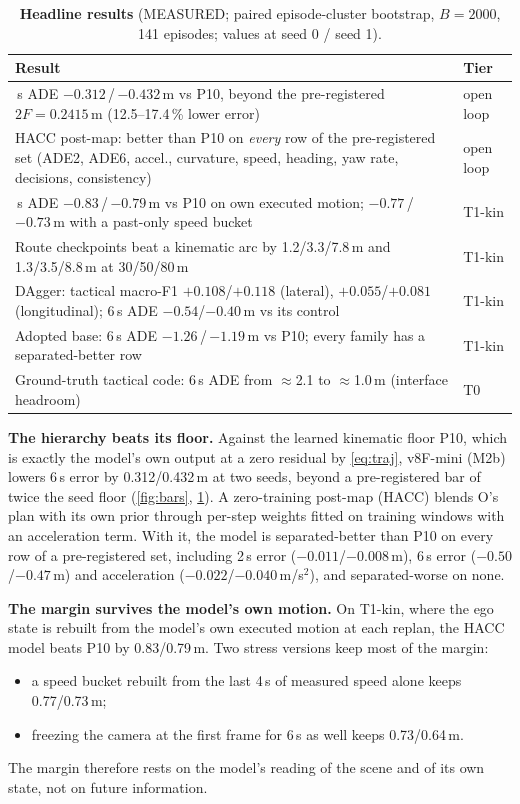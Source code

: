 \documentclass[10pt,twocolumn]{article}
\theoremstyle{remark}
\begin{document}
\begin{table}[t]
\centering
\caption{\textbf{Headline results} (MEASURED; paired episode-cluster bootstrap, $B=2000$, 141 episodes; values at seed 0 / seed 1).}
\label{tab:headline}
\small
\begin{tabularx}{\columnwidth}{@{}>{\raggedright\arraybackslash}Xl@{}}
\toprule
Result & Tier \\
\midrule
6\,s ADE $-0.312$\,/\,$-0.432$\,m vs P10, beyond the pre-registered $2F=0.2415$\,m (12.5--17.4\,\% lower error) & open loop \\
HACC post-map: better than P10 on \emph{every} row of the pre-registered set (ADE2, ADE6, accel., curvature, speed, heading, yaw rate, decisions, consistency) & open loop \\
6\,s ADE $-0.83$\,/\,$-0.79$\,m vs P10 on own executed motion; $-0.77$\,/\,$-0.73$\,m with a past-only speed bucket & T1-kin \\
Route checkpoints beat a kinematic arc by 1.2/3.3/7.8\,m and 1.3/3.5/8.8\,m at 30/50/80\,m & T1-kin \\
DAgger: tactical macro-F1 $+0.108$/$+0.118$ (lateral), $+0.055$/$+0.081$ (longitudinal); 6\,s ADE $-0.54$/$-0.40$\,m vs its control & T1-kin \\
Adopted base: 6\,s ADE $-1.26$\,/\,$-1.19$\,m vs P10; every family has a separated-better row & T1-kin \\
Ground-truth tactical code: 6\,s ADE from $\approx$2.1 to $\approx$1.0\,m (interface headroom) & T0 \\
\bottomrule
\end{tabularx}
\end{table}

\textbf{The hierarchy beats its floor.} Against the learned kinematic floor P10, which is exactly the model's own output at a zero
residual by \cref{eq:traj}, v8F-mini (M2b) lowers 6\,s error by 0.312/0.432\,m at two seeds, beyond a pre-registered bar of twice the
seed floor (\cref{fig:bars}, \cref{tab:headline}). A zero-training post-map (HACC) blends O's plan with its own prior through
per-step weights fitted on training windows with an acceleration term. With it, the model is separated-better than P10 on every row of
a pre-registered set, including 2\,s error ($-0.011$/$-0.008$\,m), 6\,s error ($-0.50$/$-0.47$\,m) and acceleration
($-0.022$/$-0.040$\,m/s$^2$), and separated-worse on none.

\textbf{The margin survives the model's own motion.} On T1-kin, where the ego state is rebuilt from the model's own executed motion at
each replan, the HACC model beats P10 by 0.83/0.79\,m. Two stress versions keep most of the margin:
\begin{itemize}
  \item a speed bucket rebuilt from the last 4\,s of measured speed alone keeps 0.77/0.73\,m;
  \item freezing the camera at the first frame for 6\,s as well keeps 0.73/0.64\,m.
\end{itemize}
The margin therefore rests on the model's reading of the scene and of its own state, not on future information.
\end{document}
